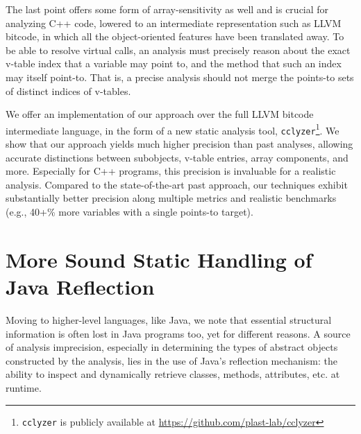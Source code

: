 \documentclass{llncs}
\newcommand{\cclyzer}{\texttt{cclyzer}}
\begin{document}
\noindent
The last point offers some form of array-sensitivity
as well and is crucial for analyzing C++ code, lowered to an
intermediate representation such as LLVM bitcode, in which all the
object-oriented features have been translated away. To be able to
resolve virtual calls, an analysis must precisely reason about the
exact v-table index that a variable may point to, and the method that
such an index may itself point-to. That is, a precise analysis should
not merge the points-to sets of distinct indices of v-tables.

We offer an implementation of our approach over the full LLVM bitcode
intermediate language, in the form of a new static analysis tool,
\cclyzer{}\footnote{\cclyzer{} is publicly available at
  \url{https://github.com/plast-lab/cclyzer}}.  We show that our
approach yields much higher precision than past analyses, allowing
accurate distinctions between subobjects, v-table entries, array
components, and more. Especially for C++ programs, this precision is
invaluable for a realistic analysis. Compared to the state-of-the-art
past approach, our techniques exhibit substantially better precision
along multiple metrics and realistic benchmarks (e.g., 40+\% more
variables with a single points-to target).

\section{More Sound Static Handling of Java Reflection}

Moving to higher-level languages, like Java, we note that essential
structural information is often lost in Java programs too, yet for
different reasons. A source of analysis imprecision, especially in
determining the types of abstract objects constructed by the analysis,
lies in the use of Java's reflection mechanism: the ability to inspect
and dynamically retrieve classes, methods, attributes, etc. at
runtime.
\end{document}
